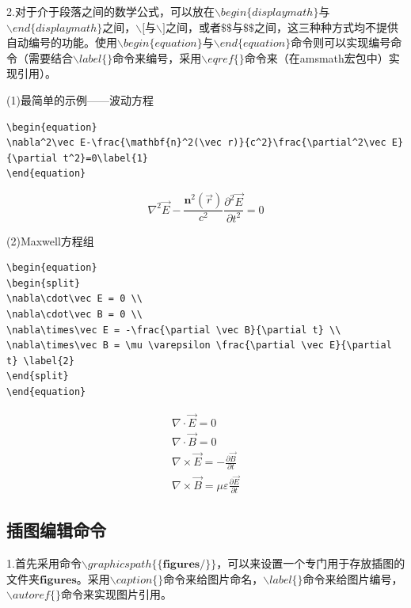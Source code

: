 \documentclass[onecolumn,a4paper,10pt]{article}
\begin{document}
2.对于介于段落之间的数学公式，可以放在$\backslash begin\{displaymath\}$与$\backslash end\{displaymath\}$之间，$\backslash [$与$\backslash ]$之间，或者$\$\$ $与$\$\$ $之间，这三种种方式均不提供自动编号的功能。使用$\backslash begin\{equation\}$与$\backslash end\{equation\}$命令则可以实现编号命令（需要结合$\backslash label\{\}$命令来编号，采用$\backslash eqref\{\}$命令来（在amsmath宏包中）实现引用）。

(1)最简单的示例——波动方程
\begin{verbatim}
\begin{equation}
\nabla^2\vec E-\frac{\mathbf{n}^2(\vec r)}{c^2}\frac{\partial^2\vec E}{\partial t^2}=0\label{1}
\end{equation}
\end{verbatim}

\begin{equation}
\nabla^2 \vec E - \frac{\mathbf{n}^2(\vec r)}{c^2}\frac{\partial^2 \vec E}{\partial t^2} = 0  \label{1}
\end{equation}

(2)Maxwell方程组
\begin{verbatim}
\begin{equation}
\begin{split}
\nabla\cdot\vec E = 0 \\
\nabla\cdot\vec B = 0 \\
\nabla\times\vec E = -\frac{\partial \vec B}{\partial t} \\
\nabla\times\vec B = \mu \varepsilon \frac{\partial \vec E}{\partial t} \label{2}
\end{split}
\end{equation}
\end{verbatim}

\begin{equation}
\begin{split}
\nabla\cdot\vec E = 0 \\
\nabla\cdot\vec B = 0 \\
\nabla\times\vec E = -\frac{\partial \vec B}{\partial t} \\
\nabla\times\vec B = \mu \varepsilon \frac{\partial \vec E}{\partial t} \label{2}
\end{split}
\end{equation}

\subsection{插图编辑命令}
1.首先采用命令$\backslash graphicspath\{\{\textbf{figures}/\}\}$，可以来设置一个专门用于存放插图的文件夹$\textbf{figures}$。采用$\backslash caption\{\}$命令来给图片命名，$\backslash label\{\}$命令来给图片编号，$\backslash autoref\{\}$命令来实现图片引用。
\end{document}

